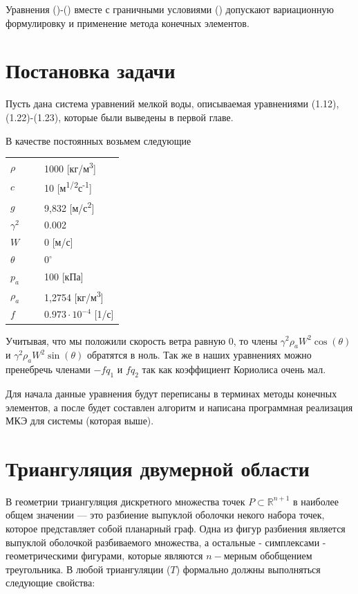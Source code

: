 \documentclass[14pt]{extreport}
\begin{document}
Уравнения ()-() вместе с граничными условиями () допускают вариационную формулировку и применение метода конечных элементов.

\chapter{Постановка задачи}

Пусть дана система уравнений мелкой воды, описываемая уравнениями (1.12), (1.22)-(1.23), которые были выведены в первой главе.


В качестве постоянных возьмем следующие

\begin{threeparttable}
\begin{longtable}[H]{lp{0.7\linewidth}}
$\rho$ & 1000 [кг/м\textsuperscript3] \\
$c$ & 10 [м\textsuperscript{1/2}с\textsuperscript{-1}] \\
$g$ & 9,832 [м/с\textsuperscript{2}] \\
$\gamma^2$ & 0.002 \\
$W$ & 0 [м/с] \\
$\theta$ & $0^{\circ}$ \\
$p_a$ & 100 [кПа] \\
$\rho_a$ & 1,2754 [кг/м\textsuperscript3] \\
$f$ & $0.973 \cdot 10^{-4}$ [1/с]
\end{longtable} 
\end{threeparttable}

Учитывая, что мы положили скорость ветра равную $0$, то члены $
\gamma^2\rho_aW^2\cos(\theta)$ и $
\gamma^2\rho_aW^2\sin(\theta)$ обратятся в ноль. Так же в наших уравнениях можно пренебречь членами $-fq_{1}$ и $fq_2$ так как коэффициент Кориолиса очень мал. 










Для начала данные уравнения будут переписаны в терминах методы конечных элементов, а после будет составлен алгоритм и написана программная реализация МКЭ для системы (которая выше).




\chapter{Триангуляция двумерной области}

В геометрии триангуляция дискретного множества точек $P\subset {\mathbb  {R}}^{{n+1}}$ в наиболее общем значении — это разбиение  выпуклой оболочки некого набора точек, которое представляет собой планарный граф. Одна из фигур разбиения является выпуклой оболочкой разбиваемого множества, а остальные - симплексами -  геометрическими фигурами, которые являются $n-$мерным обобщением треугольника. В любой триангуляции ($T$) формально должны выполняться следующие свойства:
\end{document}
